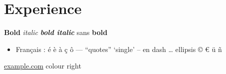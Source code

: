 \documentclass[11pt]{article}
\begin{document}
\section*{Experience}
\textbf{Bold} \textit{italic} \textbf{\textit{bold italic}} \textsf{sans \textbf{bold}}
\begin{itemize}[leftmargin=1.2em, itemsep=0pt]
  \item Français : é è à ç ô — “quotes” ‘single’ – en dash … ellipsis © € ü ñ
\end{itemize}
\href{https://example.com}{example.com} \color{blue} colour \hfill right
\end{document}
